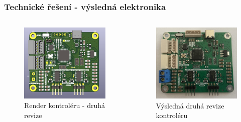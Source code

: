 \documentclass[%
  12pt,       				%
	t,                  %
	aspectratio=1610,   %
	unicode,						%
]{beamer}				    	%
\begin{document}
\begin{frame}
	\frametitle{Technické řešení - výsledná elektronika}
	\begin{columns}[T] 								%
		\begin{column}{0.5\textwidth}		%
			\begin{figure}%
				\centering	              %
				\includegraphics[width=0.8\columnwidth]{../Thesis/obrazky/pcb_rev2}
				\caption{Render kontroléru - druhá revize}%
				\label{fig:sm4_block}
			\end{figure}
		\end{column}
		\begin{column}{0.5\textwidth}		%
			\begin{figure}%
				\centering
				\includegraphics[width=0.8\columnwidth]{../Thesis/obrazky/rev2}
				\caption{Výsledná druhá revize kontroléru}%
				\label{fig:sm4_block}
			\end{figure}
		\end{column}
	\end{columns}
\end{frame}
\end{document}
